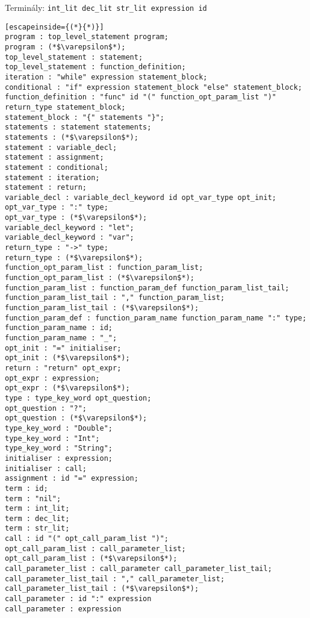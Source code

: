 Terminály: \lstinline{int_lit dec_lit str_lit expression id}

\begin{lstlisting}[escapeinside={(*}{*)}]
program : top_level_statement program;
program : (*$\varepsilon$*);
top_level_statement : statement;
top_level_statement : function_definition;
iteration : "while" expression statement_block;
conditional : "if" expression statement_block "else" statement_block;
function_definition : "func" id "(" function_opt_param_list ")" return_type statement_block;
statement_block : "{" statements "}";
statements : statement statements;
statements : (*$\varepsilon$*);
statement : variable_decl;
statement : assignment;
statement : conditional;
statement : iteration;
statement : return;
variable_decl : variable_decl_keyword id opt_var_type opt_init;
opt_var_type : ":" type;
opt_var_type : (*$\varepsilon$*);
variable_decl_keyword : "let";
variable_decl_keyword : "var";
return_type : "->" type;
return_type : (*$\varepsilon$*);
function_opt_param_list : function_param_list;
function_opt_param_list : (*$\varepsilon$*);
function_param_list : function_param_def function_param_list_tail;
function_param_list_tail : "," function_param_list;
function_param_list_tail : (*$\varepsilon$*);
function_param_def : function_param_name function_param_name ":" type;
function_param_name : id;
function_param_name : "_";
opt_init : "=" initialiser;
opt_init : (*$\varepsilon$*);
return : "return" opt_expr;
opt_expr : expression;
opt_expr : (*$\varepsilon$*);
type : type_key_word opt_question;
opt_question : "?";
opt_question : (*$\varepsilon$*);
type_key_word : "Double";
type_key_word : "Int";
type_key_word : "String";
initialiser : expression;
initialiser : call;
assignment : id "=" expression;
term : id;
term : "nil";
term : int_lit;
term : dec_lit;
term : str_lit;
call : id "(" opt_call_param_list ")";
opt_call_param_list : call_parameter_list;
opt_call_param_list : (*$\varepsilon$*);
call_parameter_list : call_parameter call_parameter_list_tail;
call_parameter_list_tail : "," call_parameter_list;
call_parameter_list_tail : (*$\varepsilon$*);
call_parameter : id ":" expression
call_parameter : expression
\end{lstlisting}
